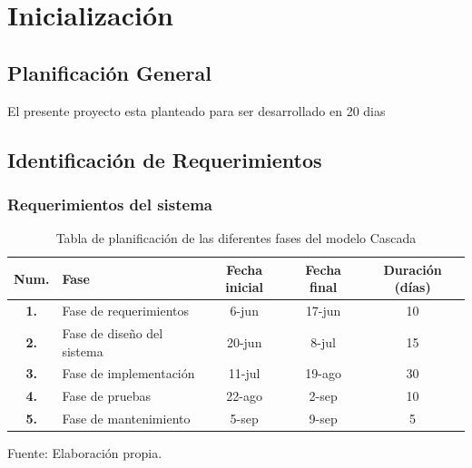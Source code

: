 \chapter{Inicialización}

\section{Planificación General}
El presente proyecto esta planteado para ser desarrollado en 20 dias

\section{Identificación de Requerimientos}
\subsection{Requerimientos del sistema}
\begin{table}[H]
    \caption{Tabla de planificación de las diferentes fases del modelo Cascada}
    \label{tabla:ejemplo}
    \begin{center}
        \begin{tabular}{|c|l|c|c|c|}
            \hline
            \textbf{Num.} & \textbf{Fase}  &  \textbf{Fecha inicial} & \textbf{Fecha final} & \textbf{Duración (días)}\\ \hline
            \textbf{1.} & Fase de requerimientos        & 6-jun        & 17-jun        & 10        \\ \hline
            \textbf{2.} & Fase de diseño del sistema       & 20-jun        & 8-jul        & 15        \\ \hline
            \textbf{3.} & Fase de implementación        & 11-jul        & 19-ago        & 30        \\ \hline
            \textbf{4.} & Fase de pruebas        & 22-ago         &   2-sep     &    10     \\ \hline
            \textbf{5.} & Fase de mantenimiento        & 5-sep        & 9-sep        & 5        \\ \hline
        \end{tabular}
    \end{center}
    \begin{center}
        Fuente: Elaboración propia.
    \end{center}
    
\end{table}


